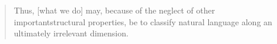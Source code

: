 
\begin{quote}
  Thus, [what we do] may, because of the neglect of other importantstructural properties, be to classify natural language along an ultimately irrelevant dimension. \parencite[436--437]{ParteeEa1990}
\end{quote}


